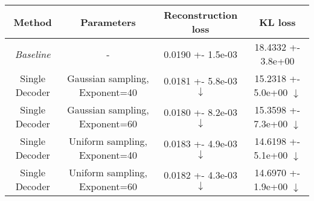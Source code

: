 \centering
\scriptsize
\begin{tabular}{||c|c|c|c||}
\hline
 Method & Parameters & Reconstruction loss & KL loss \\
\hline
\textit{Baseline} & - & 0.0190 +- 1.5e-03 & 18.4332 +- 3.8e+00 \\
\hline
Single Decoder & Gaussian sampling, Exponent=40 & 0.0181 +- 5.8e-03  $\downarrow$ & 15.2318 +- 5.0e+00  $\downarrow$ \\
\hline
Single Decoder & Gaussian sampling, Exponent=60 & 0.0180 +- 8.2e-03  $\downarrow$ & 15.3598 +- 7.3e+00  $\downarrow$ \\
\hline
Single Decoder & Uniform sampling, Exponent=40 & 0.0183 +- 4.9e-03  $\downarrow$ & 14.6198 +- 5.1e+00  $\downarrow$ \\
\hline
Single Decoder & Uniform sampling, Exponent=60 & 0.0182 +- 4.3e-03  $\downarrow$ & 14.6970 +- 1.9e+00  $\downarrow$ \\
\hline
\end{tabular}
